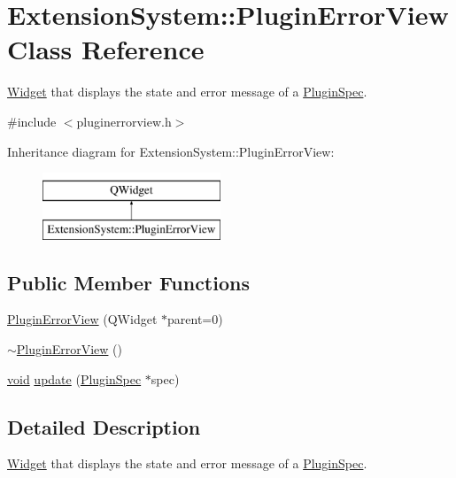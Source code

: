 \hypertarget{class_extension_system_1_1_plugin_error_view}{\section{Extension\-System\-:\-:Plugin\-Error\-View Class Reference}
\label{class_extension_system_1_1_plugin_error_view}
}


\hyperlink{class_widget}{Widget} that displays the state and error message of a \hyperlink{class_extension_system_1_1_plugin_spec}{Plugin\-Spec}.  




{\ttfamily \#include $<$pluginerrorview.\-h$>$}

Inheritance diagram for Extension\-System\-:\-:Plugin\-Error\-View\-:\begin{figure}[H]
\begin{center}
\leavevmode
\includegraphics[height=2.000000cm]{class_extension_system_1_1_plugin_error_view}
\end{center}
\end{figure}
\subsection*{Public Member Functions}
\begin{DoxyCompactItemize}
\item 
\hyperlink{class_extension_system_1_1_plugin_error_view_a8326b6848e7d40858281d7ded8f27b45}{Plugin\-Error\-View} (Q\-Widget $\ast$parent=0)
\item 
\hyperlink{class_extension_system_1_1_plugin_error_view_a5e358af244a8bde0b5589a5ffd45f2ef}{$\sim$\-Plugin\-Error\-View} ()
\item 
\hyperlink{group___u_a_v_objects_plugin_ga444cf2ff3f0ecbe028adce838d373f5c}{void} \hyperlink{class_extension_system_1_1_plugin_error_view_a327bd28795dc7c380440bc795e814efd}{update} (\hyperlink{class_extension_system_1_1_plugin_spec}{Plugin\-Spec} $\ast$spec)
\end{DoxyCompactItemize}


\subsection{Detailed Description}
\hyperlink{class_widget}{Widget} that displays the state and error message of a \hyperlink{class_extension_system_1_1_plugin_spec}{Plugin\-Spec}. 


